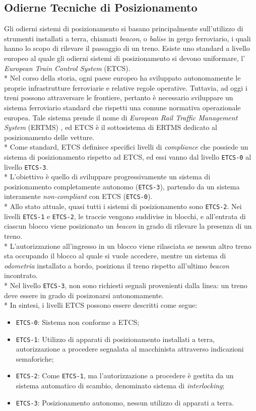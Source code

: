 \subsection{Odierne Tecniche di Posizionamento}
Gli odierni sistemi di posizionamento si basano principalmente sull'utilizzo di strumenti installati a terra, chiamati \emph{beacon}, o \emph{balise} in gergo ferroviario, i quali hanno lo scopo di rilevare il passaggio di un treno.\cite{tecnicheodierne}
Esiste uno standard a livello europeo al quale gli odierni sistemi di posizionamento si devono uniformare, l' \emph{European Train Control System} (ETCS).\\*
Nel corso della storia, ogni paese europeo ha sviluppato autonomamente le proprie infrastrutture ferroviarie e relative regole operative. Tuttavia, ad oggi i treni possono attraversare le frontiere, pertanto \`e necessario sviluppare un sistema ferroviario standard che rispetti una comune normativa operazionale europea. Tale sistema prende il nome di \emph{European Rail Traffic Management System} (ERTMS) \cite{ertms}, ed ETCS \`e il sottosistema di ERTMS dedicato al posizionamento delle vetture.\\*
Come standard, ETCS definisce specifici livelli di \emph{compliance} che possiede un sistema di posizionamento rispetto ad ETCS, ed essi vanno dal livello \texttt{ETCS-0} al livello \texttt{ETCS-3}.\\*
L'obiettivo \`e quello di sviluppare progressivamente un sistema di posizionamento completamente autonomo (\texttt{ETCS-3}), partendo da un sistema interamente \emph{non-compliant} con ETCS (\texttt{ETCS-0}).
\\*
Allo stato attuale, quasi tutti i sistemi di posizionamento sono \texttt{ETCS-2}. Nei livelli \texttt{ETCS-1} e \texttt{ETCS-2}, le traccie vengono suddivise in blocchi, e all'entrata di ciascun blocco viene posizionato un \emph{beacon} in grado di rilevare la presenza di un treno.\\*
L'autorizzazione all'ingresso in un blocco viene rilasciata se nessun altro treno sta occupando il blocco al quale si vuole accedere, mentre un sistema di \emph{odometria} installato a bordo, posiziona il treno rispetto all'ultimo \emph{beacon} incontrato.\\*
Nel livello \texttt{ETCS-3}, non sono richiesti segnali provenienti dalla linea: un treno deve essere in grado di posizonarsi autonomamente. \cite{etcs3}\\*
In sintesi, i livelli ETCS possono essere descritti come segue:
\begin{itemize}
	\item \texttt{ETCS-0}: Sistema non conforme a ETCS;
	\item \texttt{ETCS-1}: Utilizzo di apparati di posizionamento installati a terra, autorizzazione a procedere segnalata al macchinista attraverso indicazioni semaforiche;
	\item \texttt{ETCS-2}: Come \texttt{ETCS-1}, ma l'autorizzazione a procedere \`e gestita da un sistema automatico di scambio, denominato sistema di \emph{interlocking};\cite{interlocking}
	\item \texttt{ETCS-3}: Posizionamento autonomo, nessun utilizzo di apparati a terra.
\end{itemize}

